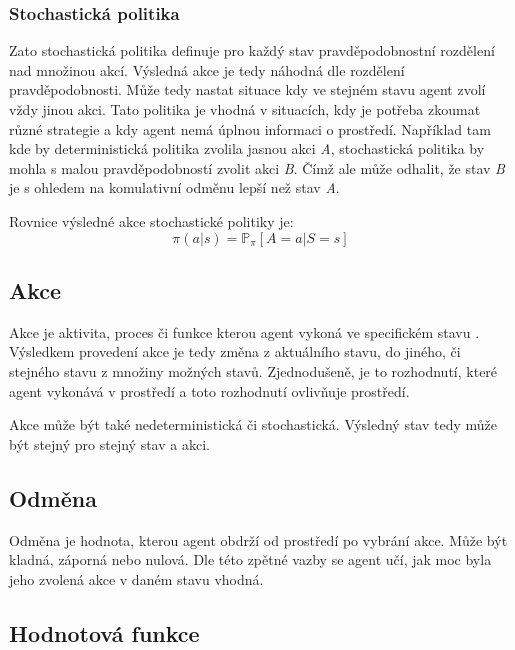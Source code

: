   \subsubsection*{Stochastická politika}
  
  Zato stochastická politika definuje pro každý stav pravděpodobnostní rozdělení nad množinou akcí.
  Výsledná akce je tedy náhodná dle rozdělení pravděpodobnosti.
  Může tedy nastat situace kdy ve stejném stavu agent zvolí vždy jinou akci.
  Tato politika je vhodná v situacích, kdy je potřeba zkoumat různé strategie a kdy agent nemá úplnou informaci o prostředí.
  Například tam kde by deterministická politika zvolila jasnou akci \textit{A}, stochastická politika by mohla s malou pravděpodobností zvolit akci \textit{B}.
  Čímž ale může odhalit, že stav \textit{B} je s ohledem na komulativní odměnu lepší než stav \textit{A}.\cite{Policies}

  Rovnice výsledné akce stochastické politiky je:
  \begin{equation}
    \pi(a \vert s) = \mathbb{P}_\pi [A=a \vert S=s]\label{eq:policy_stochastic}
  \end{equation}

\subsection{Akce}\label{subsec:akce}

Akce je aktivita, proces či funkce kterou agent vykoná ve specifickém stavu \cite{ActionCo67}.
Výsledkem provedení akce je tedy změna z aktuálního stavu, do jiného, či stejného stavu z množiny možných stavů.
Zjednodušeně, je to rozhodnutí, které agent vykonává v prostředí a toto rozhodnutí ovlivňuje prostředí.

Akce může být také nedeterministická či stochastická.
Výsledný stav tedy může být stejný pro stejný stav a akci.
  
\subsection{Odměna}\label{subsec:odmena}

  Odměna je hodnota, kterou agent obdrží od prostředí po vybrání akce.
  Může být kladná, záporná nebo nulová.
  Dle této zpětné vazby se agent učí, jak moc byla jeho zvolená akce v daném stavu vhodná.

\subsection{Hodnotová funkce}\label{subsec:hodnotova-funkce}

